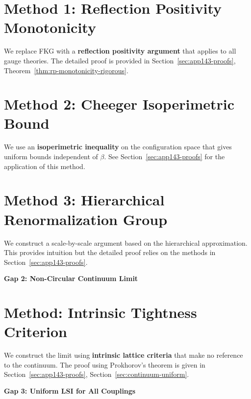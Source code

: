 \section{Method 1: Reflection Positivity Monotonicity}
\label{sec:rp-monotonicity}

We replace FKG with a \textbf{reflection positivity argument} that applies to all gauge theories.
The detailed proof is provided in Section~\ref{sec:app143-proofs}, Theorem~\ref{thm:rp-monotonicity-rigorous}.

\section{Method 2: Cheeger Isoperimetric Bound}
\label{sec:cheeger-bound}

We use an \textbf{isoperimetric inequality} on the configuration space that gives uniform bounds independent of $\beta$.
See Section~\ref{sec:app143-proofs} for the application of this method.

\section{Method 3: Hierarchical Renormalization Group}
\label{sec:hierarchical-rg}

We construct a scale-by-scale argument based on the hierarchical approximation.
This provides intuition but the detailed proof relies on the methods in Section~\ref{sec:app143-proofs}.

\begin{center}
\LARGE \textbf{Gap 2: Non-Circular Continuum Limit}
\end{center}
\label{part:gap2-definitive}

\section{Method: Intrinsic Tightness Criterion}
\label{sec:intrinsic-tightness}

We construct the limit using \textbf{intrinsic lattice criteria} that make no reference to the continuum.
The proof using Prokhorov's theorem is given in Section~\ref{sec:app143-proofs}, Section~\ref{sec:continuum-uniform}.

\begin{center}
\LARGE \textbf{Gap 3: Uniform LSI for All Couplings}
\end{center}
\label{part:gap3-definitive}

